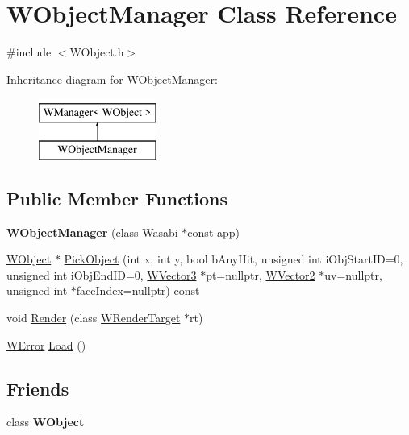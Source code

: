 \hypertarget{class_w_object_manager}{}\section{W\+Object\+Manager Class Reference}
\label{class_w_object_manager}


{\ttfamily \#include $<$W\+Object.\+h$>$}

Inheritance diagram for W\+Object\+Manager\+:\begin{figure}[H]
\begin{center}
\leavevmode
\includegraphics[height=2.000000cm]{class_w_object_manager}
\end{center}
\end{figure}
\subsection*{Public Member Functions}
\begin{DoxyCompactItemize}
\item 
{\bfseries W\+Object\+Manager} (class \hyperlink{class_wasabi}{Wasabi} $\ast$const app)\hypertarget{class_w_object_manager_a6ac9e43e828feff89da389bff3504bbd}{}\label{class_w_object_manager_a6ac9e43e828feff89da389bff3504bbd}

\item 
\hyperlink{class_w_object}{W\+Object} $\ast$ \hyperlink{class_w_object_manager_a589763cdee79fc0410ba560fcae327a0}{Pick\+Object} (int x, int y, bool b\+Any\+Hit, unsigned int i\+Obj\+Start\+ID=0, unsigned int i\+Obj\+End\+ID=0, \hyperlink{class_w_vector3}{W\+Vector3} $\ast$pt=nullptr, \hyperlink{class_w_vector2}{W\+Vector2} $\ast$uv=nullptr, unsigned int $\ast$face\+Index=nullptr) const 
\item 
void \hyperlink{class_w_object_manager_a7c0543b08ecbc6ddc019402cc62d0c1b}{Render} (class \hyperlink{class_w_render_target}{W\+Render\+Target} $\ast$rt)
\item 
\hyperlink{class_w_error}{W\+Error} \hyperlink{class_w_object_manager_abbb11fb7005e059f2057b0d3dfac55a9}{Load} ()
\end{DoxyCompactItemize}
\subsection*{Friends}
\begin{DoxyCompactItemize}
\item 
class {\bfseries W\+Object}\hypertarget{class_w_object_manager_a703e2c74495afdc3c9205669cd3517df}{}\label{class_w_object_manager_a703e2c74495afdc3c9205669cd3517df}

\end{DoxyCompactItemize}
